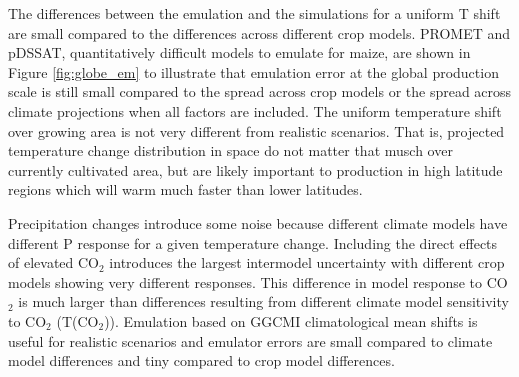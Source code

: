 \documentclass[gmd, manuscript]{copernicus} %
\begin{document}
The differences between the emulation and the simulations for a uniform T shift are small compared to the differences across different crop models.
PROMET and pDSSAT, quantitatively difficult models to emulate for maize, are shown in Figure \ref{fig:globe_em} to illustrate that emulation error at the global production scale is still small compared to the spread across crop models or the spread across climate projections when all factors are included.
The uniform temperature shift over growing area is not very different from realistic scenarios. 
That is, projected temperature change distribution in space do not matter that musch over currently cultivated area, but are likely important to production in high latitude regions which will warm much faster than lower latitudes.

Precipitation changes introduce some noise because different climate models have different P response for a given temperature change.
Including the direct effects of elevated CO$_2$ introduces the largest intermodel uncertainty with different crop models showing very different responses. 
This difference in model response to CO$_2$ is much larger than differences resulting from different climate model sensitivity to CO$_2$ (T(CO$_2$)).
Emulation based on GGCMI climatological mean shifts is useful for realistic scenarios and emulator errors are small compared to climate model differences and tiny compared to crop model differences.


\end{document}
